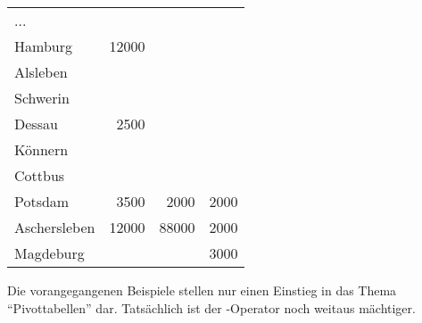 \begin{center}
\begin{small}
\begin{oraclesql}
\begin{supertabular}{lrrr}
                ... & & & \\
                Hamburg & 12000 &  &  \\
                Alsleben &  &  &  \\
                Schwerin &  &  &  \\
                Dessau & 2500 &  &  \\
                Könnern &  &  &  \\
                Cottbus &  &  &  \\
                Potsdam & 3500 & 2000 & 2000 \\
                Aschersleben & 12000 & 88000 & 2000 \\
                Magdeburg &  &  & 3000 \\
            \end{supertabular}
        \end{oraclesql}
    \end{small}
\end{center}
Die vorangegangenen Beispiele stellen nur einen Einstieg in das Thema \enquote{Pivottabellen} dar. Tatsächlich ist der -Operator noch weitaus mächtiger.
